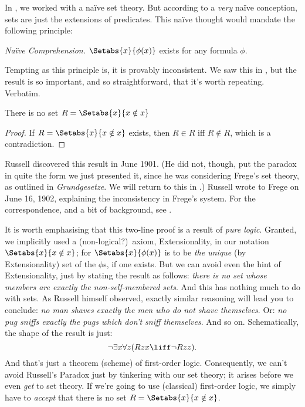 \documentclass[../../../include/open-logic-section]{subfiles}
\begin{document}

In , we worked with a na\"{i}ve set theory. But
according to a \emph{very} na\"{i}ve conception, sets are just the
extensions of predicates. This na\"ive thought would mandate the
following principle:

\begin{defish}
  \emph{Na\"{i}ve Comprehension.} $\Setabs{x}{\phi(x)}$ exists for any formula $\phi$.
\end{defish}

Tempting as this principle is, it is provably inconsistent. We saw this in , but the result is so important, and so straightforward, that it's worth repeating. Verbatim.

\begin{thm}
There is no set $R = \Setabs{x}{x \notin x}$
\end{thm}

\begin{proof}
If $R = \Setabs{x}{x \notin x}$ exists, then
$R \in R$ iff $R \notin R$, which is a contradiction.
\end{proof}

Russell discovered this result in June 1901. (He did not, though, put
the paradox in quite the form we just presented it, since he was
considering Frege's set theory, as outlined in \emph{Grundgesetze}. We
will return to this in .) Russell wrote to
Frege on June 16, 1902, explaining the inconsistency in Frege's
system. For the correspondence, and a bit of background, see
\cite[pp.~124--8]{Heijenoort1967}. 

It is worth emphasising that this two-line proof is a result of
\emph{pure logic}. Granted, we implicitly used a (non-logical?)\ axiom, Extensionality, in our notation $\Setabs{x}{x \notin x}$; for $\Setabs{x}{\phi(x)}$ is to be \emph{the unique} (by Extensionality) set of the $\phi$s, if one exists. But we can avoid even the hint of Extensionality, just by stating the result as follows:
\emph{there is no set whose members are exactly the non-self-membered
sets}. And this has nothing much to do with sets. As Russell himself observed, exactly similar reasoning
will lead you to conclude: \emph{no man shaves exactly the men who do
not shave themselves}. Or: \emph{no pug sniffs exactly the pugs which
don't sniff themselves}. And so on. Schematically, the shape of the
result is just: 
\[
\lnot \exists x \forall z(Rzx \liff \lnot R zz).
\]
And that's just a theorem (scheme) of first-order logic. Consequently,
we can't avoid Russell's Paradox just by tinkering with our set
theory; it arises before we even \emph{get} to set theory. If we're
going to use (classical) first-order logic, we simply have to
\emph{accept} that there is no set $R = \Setabs{x}{x\notin x}$. 
\end{document}
